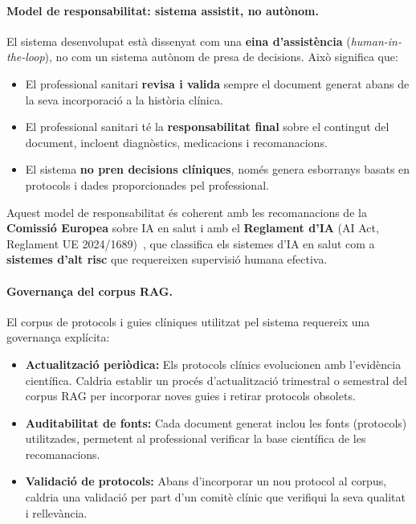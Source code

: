 \documentclass[CAT]{TFUOC}%
\begin{document}
\paragraph{Model de responsabilitat: sistema assistit, no autònom.}
El sistema desenvolupat està dissenyat com una \textbf{eina d'assistència} (\textit{human-in-the-loop}), no com un sistema autònom de presa de decisions. Això significa que:
\begin{itemize}
    \item El professional sanitari \textbf{revisa i valida} sempre el document generat abans de la seva incorporació a la història clínica.
    \item El professional sanitari té la \textbf{responsabilitat final} sobre el contingut del document, incloent diagnòstics, medicacions i recomanacions.
    \item El sistema \textbf{no pren decisions clíniques}, només genera esborranys basats en protocols i dades proporcionades pel professional.
\end{itemize}

Aquest model de responsabilitat és coherent amb les recomanacions de la \textbf{Comissió Europea} sobre IA en salut i amb el \textbf{Reglament d'IA} (AI Act, Reglament UE 2024/1689)~\cite{eu2024aiact}, que classifica els sistemes d'IA en salut com a \textbf{sistemes d'alt risc} que requereixen supervisió humana efectiva.

\paragraph{Governança del corpus RAG.}
El corpus de protocols i guies clíniques utilitzat pel sistema requereix una governança explícita:
\begin{itemize}
    \item \textbf{Actualització periòdica:} Els protocols clínics evolucionen amb l'evidència científica. Caldria establir un procés d'actualització trimestral o semestral del corpus RAG per incorporar noves guies i retirar protocols obsolets.
    \item \textbf{Auditabilitat de fonts:} Cada document generat inclou les fonts (protocols) utilitzades, permetent al professional verificar la base científica de les recomanacions.
    \item \textbf{Validació de protocols:} Abans d'incorporar un nou protocol al corpus, caldria una validació per part d'un comitè clínic que verifiqui la seva qualitat i rellevància.
\end{itemize}
\end{document}
